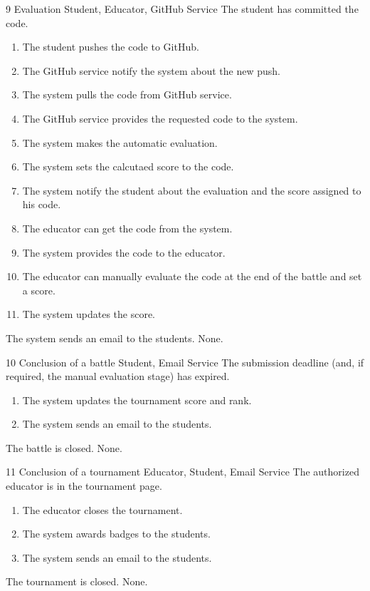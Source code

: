 \usecase
{9}
{Evaluation} %
{Student, Educator, GitHub Service} %
{The student has committed the code.} %
{ %
    \begin{enumerate}
        \item The student pushes the code to GitHub.
        \item The GitHub service notify the system about the new push.
        \item The system pulls the code from GitHub service.
        \item The GitHub service provides the requested code to the system.
        \item The system makes the automatic evaluation.
        \item The system sets the calcutaed score to the code.
        \item The system notify the student about the evaluation and the score assigned to his code.
        \item The educator can get the code from the system.
        \item The system provides the code to the educator.
        \item The educator can manually evaluate the code at the end of the battle and set a score.
        \item The system updates the score.
    \end{enumerate}
}
{The system sends an email to the students.} %
{ %
 None. 
}
{ %
}
\clearpage

\usecase
{10}
{Conclusion of a battle}
{Student, Email Service}
{The submission deadline (and, if required, the manual evaluation stage) has expired.}
{
    \begin{enumerate}
        \item The system updates the tournament score and rank.
        \item The system sends an email to the students.
    \end{enumerate}
}
{The battle is closed.}
{
    None.
}
{}


\usecase
{11}
{Conclusion of a tournament}
{Educator, Student, Email Service}
{The authorized educator is in the tournament page.}
{
    \begin{enumerate}
        \item The educator closes the tournament.
        \item The system awards badges to the students.
        \item The system sends an email to the students.
    \end{enumerate}
}
{The tournament is closed.}
{
    None.
}
{}

